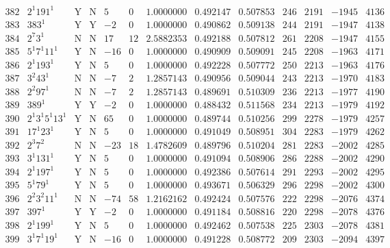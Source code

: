 \documentclass[11pt,reqno,a4letter]{article}
\numberwithin{equation}{section}
\numberwithin{figure}{section}
\numberwithin{table}{section}
\theoremstyle{plain}
\numberwithin{theorem}{section}
\theoremstyle{definition}
\begin{document}
\begin{table}[ht]
\begin{equation*}
{\begin{array}{cc|cc|ccc|cc|cccc}
 382 & 2^1 191^1 & \text{Y} & \text{N} & 5 & 0 & 1.0000000 & 0.492147 & 0.507853 & 246 & 2191 & -1945 & 4136 \\
 383 & 383^1 & \text{Y} & \text{Y} & -2 & 0 & 1.0000000 & 0.490862 & 0.509138 & 244 & 2191 & -1947 & 4138 \\
 384 & 2^7 3^1 & \text{N} & \text{N} & 17 & 12 & 2.5882353 & 0.492188 & 0.507812 & 261 & 2208 & -1947 & 4155 \\
 385 & 5^1 7^1 11^1 & \text{Y} & \text{N} & -16 & 0 & 1.0000000 & 0.490909 & 0.509091 & 245 & 2208 & -1963 & 4171 \\
 386 & 2^1 193^1 & \text{Y} & \text{N} & 5 & 0 & 1.0000000 & 0.492228 & 0.507772 & 250 & 2213 & -1963 & 4176 \\
 387 & 3^2 43^1 & \text{N} & \text{N} & -7 & 2 & 1.2857143 & 0.490956 & 0.509044 & 243 & 2213 & -1970 & 4183 \\
 388 & 2^2 97^1 & \text{N} & \text{N} & -7 & 2 & 1.2857143 & 0.489691 & 0.510309 & 236 & 2213 & -1977 & 4190 \\
 389 & 389^1 & \text{Y} & \text{Y} & -2 & 0 & 1.0000000 & 0.488432 & 0.511568 & 234 & 2213 & -1979 & 4192 \\
 390 & 2^1 3^1 5^1 13^1 & \text{Y} & \text{N} & 65 & 0 & 1.0000000 & 0.489744 & 0.510256 & 299 & 2278 & -1979 & 4257 \\
 391 & 17^1 23^1 & \text{Y} & \text{N} & 5 & 0 & 1.0000000 & 0.491049 & 0.508951 & 304 & 2283 & -1979 & 4262 \\
 392 & 2^3 7^2 & \text{N} & \text{N} & -23 & 18 & 1.4782609 & 0.489796 & 0.510204 & 281 & 2283 & -2002 & 4285 \\
 393 & 3^1 131^1 & \text{Y} & \text{N} & 5 & 0 & 1.0000000 & 0.491094 & 0.508906 & 286 & 2288 & -2002 & 4290 \\
 394 & 2^1 197^1 & \text{Y} & \text{N} & 5 & 0 & 1.0000000 & 0.492386 & 0.507614 & 291 & 2293 & -2002 & 4295 \\
 395 & 5^1 79^1 & \text{Y} & \text{N} & 5 & 0 & 1.0000000 & 0.493671 & 0.506329 & 296 & 2298 & -2002 & 4300 \\
 396 & 2^2 3^2 11^1 & \text{N} & \text{N} & -74 & 58 & 1.2162162 & 0.492424 & 0.507576 & 222 & 2298 & -2076 & 4374 \\
 397 & 397^1 & \text{Y} & \text{Y} & -2 & 0 & 1.0000000 & 0.491184 & 0.508816 & 220 & 2298 & -2078 & 4376 \\
 398 & 2^1 199^1 & \text{Y} & \text{N} & 5 & 0 & 1.0000000 & 0.492462 & 0.507538 & 225 & 2303 & -2078 & 4381 \\
 399 & 3^1 7^1 19^1 & \text{Y} & \text{N} & -16 & 0 & 1.0000000 & 0.491228 & 0.508772 & 209 & 2303 & -2094 & 4397 \\

\end{array}}
\end{equation*}
\end{table}
\end{document}

